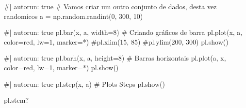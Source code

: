 \documentclass[
  letterpaper,
  DIV=11,
  numbers=noendperiod]{scrreprt}
\newenvironment{Shaded}{\begin{snugshade}}{\end{snugshade}}
\newcommand{\NormalTok}[1]{\textcolor[rgb]{0.00,0.23,0.31}{#1}}
\begin{document}
\begin{Shaded}
\begin{Highlighting}[]
\NormalTok{\#| autorun: true}
\NormalTok{\# Vamos criar um outro conjunto de dados, desta vez randomicos}
\NormalTok{a = np.random.randint(0, 300, 10)}
\end{Highlighting}
\end{Shaded}

\begin{Shaded}
\begin{Highlighting}[]
\NormalTok{\#| autorun: true}
\NormalTok{pl.bar(x, a, width=8) \# Criando gráficos de barra}
\NormalTok{pl.plot(x, a, color=\textquotesingle{}red\textquotesingle{}, lw=1, marker=\textquotesingle{}*\textquotesingle{})}
\NormalTok{\#pl.xlim(15, 85)}
\NormalTok{\#pl.ylim(200, 300)}
\NormalTok{pl.show()}
\end{Highlighting}
\end{Shaded}

\begin{Shaded}
\begin{Highlighting}[]
\NormalTok{\#| autorun: true}
\NormalTok{pl.barh(x, a, height=8) \# Barras horizontais}
\NormalTok{pl.plot(a, x, color=\textquotesingle{}red\textquotesingle{}, lw=1, marker=\textquotesingle{}*\textquotesingle{})}
\NormalTok{pl.show()}
\end{Highlighting}
\end{Shaded}

\begin{Shaded}
\begin{Highlighting}[]
\NormalTok{\#| autorun: true}
\NormalTok{pl.step(x, a) \# Plots Steps}
\NormalTok{pl.show()}
\end{Highlighting}
\end{Shaded}

\begin{Shaded}
\begin{Highlighting}[]
\NormalTok{pl.stem?}
\end{Highlighting}
\end{Shaded}
\end{document}
